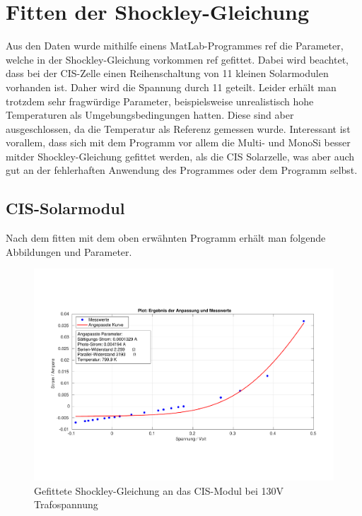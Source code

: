 
\clearpage
\section{Fitten der Shockley-Gleichung}

Aus den Daten wurde mithilfe einens MatLab-Programmes ref die Parameter, welche in der Shockley-Gleichung vorkommen ref gefittet. Dabei wird beachtet, 
dass bei der CIS-Zelle einen Reihenschaltung von 11 kleinen Solarmodulen vorhanden ist. Daher wird die Spannung durch 11 geteilt. Leider erhält man 
trotzdem sehr fragwürdige Parameter, beispielsweise unrealistisch hohe Temperaturen als Umgebungsbedingungen hatten. Diese sind aber ausgeschlossen, 
da die Temperatur als Referenz gemessen wurde.
Interessant ist vorallem, dass sich mit dem Programm vor allem die Multi- und MonoSi besser mitder Shockley-Gleichung gefittet werden, als 
die CIS Solarzelle, was aber auch gut an der fehlerhaften Anwendung des Programmes oder dem Programm selbst.

\subsection{CIS-Solarmodul}

Nach dem fitten mit dem oben erwähnten Programm erhält man folgende Abbildungen und Parameter.

\begin{figure}[ht]
    \centering
    \includegraphics[width = \linewidth]{Bilder/CIS130Plot.pdf}
    \caption{Gefittete Shockley-Gleichung an das CIS-Modul bei 130V Trafospannung}
    
\end{figure}

